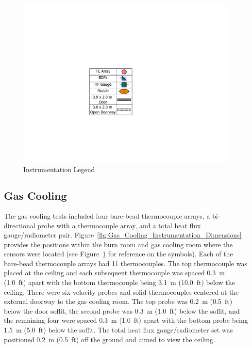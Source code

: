 \documentclass[12pt,oneside]{book}
\begin{document}
\begin{figure}[!ht]
	\includegraphics[width=.35\columnwidth]{../Figures/Floor_Plans/PDFs/DelCo_2012_Instrumentation_Legend}
	\caption{Instrumentation Legend}
	\label{fig:Instrumentation_Legend}
\end{figure}

\subsection{Gas Cooling}
\label{subsec:Gas_Cooling_Instrumentation}

The gas cooling tests included four bare-bead thermocouple arrays, a bi-directional probe with a thermocouple array, and a total heat flux gauge/radiometer pair. Figure~\ref{fig:Gas_Cooling_Instrumentation_Dimensions} provides the positions within the burn room and gas cooling room where the sensors were located (see Figure~\ref{fig:Instrumentation_Legend} for reference on the symbols). Each of the bare-bead thermocouple arrays had 11 thermocouples. The top thermocouple was placed at the ceiling and each subsequent thermocouple was spaced 0.3~m (1.0~ft) apart with the bottom thermocouple being 3.1~m (10.0~ft) below the ceiling. There were six velocity probes and solid thermocouples centered at the external doorway to the gas cooling room. The top probe was 0.2~m (0.5~ft) below the door soffit, the second probe was 0.3~m (1.0~ft) below the soffit, and the remaining four were spaced 0.3~m (1.0~ft) apart with the bottom probe being 1.5~m (5.0~ft) below the soffit. The total heat flux gauge/radiometer set was positioned 0.2~m (0.5~ft) off the ground and aimed to view the ceiling.
\end{document}
